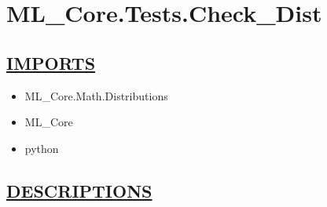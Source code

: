 \chapter*{ML\_Core.Tests.Check\_Dist}
\hypertarget{ecldoc:toc:ML_Core.Tests.Check_Dist}{}

\section*{\underline{IMPORTS}}
\begin{itemize}
\item ML\_Core.Math.Distributions
\item ML\_Core
\item python
\end{itemize}

\section*{\underline{DESCRIPTIONS}}
